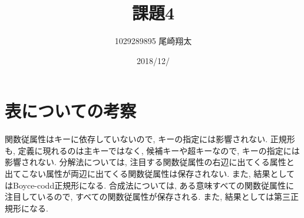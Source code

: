 \documentclass{jarticle}
\begin{document}
\title{課題4}
\author{1029289895 尾崎翔太}
\date{2018/12/}

\maketitle
\newpage


\section{表についての考察}
関数従属性はキーに依存していないので, キーの指定には影響されない. 正規形も, 定義に現れるのは主キーではなく, 候補キーや超キーなので, キーの指定には影響されない. 分解法については, 注目する関数従属性の右辺に出てくる属性と出てこない属性が両辺に出てくる関数従属性は保存されない. また, 結果としてはBoyce-codd正規形になる. 合成法については, ある意味すべての関数従属性に注目しているので, すべての関数従属性が保存される. また, 結果としては第三正規形になる.
\end{document}
